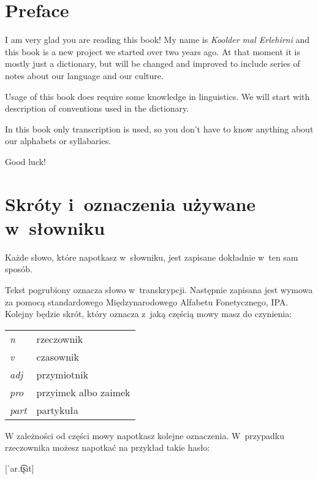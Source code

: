 \newpage

\section{Preface}

\begin{spacing}{1.1}

I am very glad you are reading this book! My name is \emph{Koolder mal
Erlehirni} and this book is a new project we started over two years ago. At that
moment it is mostly just a dictionary, but will be changed and improved to
include series of notes about our language and our culture.

Usage of this book does require some knowledge in linguistics. We will start
with description of conventions used in the dictionary.

In this book only transcription is used, so you don't have to know anything
about our alphabets or syllabaries.

\bigskip

Good luck!

\section[Skróty i~oznaczenia]{Skróty i~oznaczenia używane w~słowniku}

Każde słowo, które napotkasz w~słowniku, jest zapisane dokładnie w~ten sam
sposób.

Tekst pogrubiony oznacza słowo w~transkrypcji. Następnie zapisana jest wymowa za
pomocą standardowego Międzynarodowego Alfabetu Fonetycznego, IPA. Kolejny będzie
skrót, który oznacza z~jaką częścią mowy masz do czynienia:

\begin{table}[h]
\begin{tabular}{ll}
\emph{n}    & rzeczownik           \\
\emph{v}    & czasownik            \\
\emph{adj}  & przymiotnik          \\
\emph{pro}  & przyimek albo zaimek \\
\emph{part} & partykuła           
\end{tabular}
\end{table}

W zależności od części mowy napotkasz kolejne oznaczenia. W~przypadku
rzeczownika możesz napotkać na przykład takie hasło:

[ˈar.t͡ʂit]
\skipline


\end{spacing}

